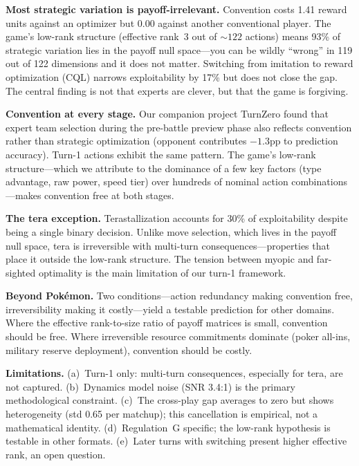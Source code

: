 \documentclass{article}
\begin{document}
\textbf{Most strategic variation is payoff-irrelevant.} Convention costs 1.41 reward units against an optimizer but 0.00 against another conventional player. The game's low-rank structure (effective rank~3 out of ${\sim}122$ actions) means 93\% of strategic variation lies in the payoff null space---you can be wildly ``wrong'' in 119 out of 122 dimensions and it does not matter. Switching from imitation to reward optimization (CQL) narrows exploitability by 17\% but does not close the gap. The central finding is not that experts are clever, but that the game is forgiving.

\textbf{Convention at every stage.} Our companion project TurnZero \citep{brennan2026turnzero} found that expert team selection during the pre-battle preview phase also reflects convention rather than strategic optimization (opponent contributes $-1.3$pp to prediction accuracy). Turn-1 actions exhibit the same pattern. The game's low-rank structure---which we attribute to the dominance of a few key factors (type advantage, raw power, speed tier) over hundreds of nominal action combinations---makes convention free at both stages.

\textbf{The tera exception.} Terastallization accounts for 30\% of exploitability despite being a single binary decision. Unlike move selection, which lives in the payoff null space, tera is irreversible with multi-turn consequences---properties that place it outside the low-rank structure. The tension between myopic and far-sighted optimality is the main limitation of our turn-1 framework.

\textbf{Beyond Pok\'emon.} Two conditions---action redundancy making convention free, irreversibility making it costly---yield a testable prediction for other domains. Where the effective rank-to-size ratio of payoff matrices is small, convention should be free. Where irreversible resource commitments dominate (poker all-ins, military reserve deployment), convention should be costly.

\textbf{Limitations.} (a)~Turn-1 only: multi-turn consequences, especially for tera, are not captured. (b)~Dynamics model noise (SNR 3.4:1) is the primary methodological constraint. (c)~The cross-play gap averages to zero but shows heterogeneity (std 0.65 per matchup); this cancellation is empirical, not a mathematical identity. (d)~Regulation~G specific; the low-rank hypothesis is testable in other formats. (e)~Later turns with switching present higher effective rank, an open question.



\end{document}

